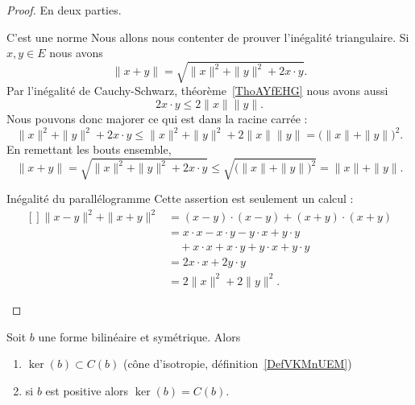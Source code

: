 \begin{proof}
    En deux parties.
    \begin{subproof}
        \item[C'est une norme]
            Nous allons nous contenter de prouver l'inégalité triangulaire. Si \( x,y\in E\) nous avons
            \begin{equation}
                \| x+y \|=\sqrt{\| x \|^2+\| y \|^2+2x\cdot y}.
            \end{equation}
            Par l'inégalité de Cauchy-Schwarz, théorème~\ref{ThoAYfEHG} nous avons aussi
            \begin{equation}
                2x\cdot y\leq 2\| x \|\| y \|.
            \end{equation}
            Nous pouvons donc majorer ce qui est dans la racine carrée :
            \begin{equation}
                \| x \|^2+\| y \|^2+2x\cdot y\leq \| x \|^2+\| y \|^2+2\| x \|\| y \|=\big( \| x \|+\| y \| \big)^2.
            \end{equation}
            En remettant les bouts ensemble,
            \begin{equation}
                \| x+y \|  =\sqrt{\| x \|^2+\| y \|^2+2x\cdot y}  \leq \sqrt{\big( \| x \|+\| y \| \big)^2}=\| x \|+\| y \|.
            \end{equation}

        \item[Inégalité du parallélogramme]
            Cette assertion est seulement un calcul :
            \begin{equation}
                \begin{aligned}[]
                    \| x-y \|^2+\| x+y \|^2&=(x-y)\cdot (x-y)+(x+y)\cdot(x+y)\\
                    &=x\cdot x-x\cdot y-y\cdot x+y\cdot y\\
                    &\quad +x\cdot x+x\cdot y+y\cdot x+y\cdot y\\
                    &=2x\cdot x+2y\cdot y\\
                    &=2\| x \|^2+2\| y \|^2.
                \end{aligned}
            \end{equation}
    \end{subproof}
\end{proof}

\begin{proposition}     \label{PropHIWjdMX}
    Soit \( b\) une forme bilinéaire et symétrique. Alors
    \begin{enumerate}
        \item
            \( \ker(b)\subset C(b)\) (cône d'isotropie, définition~\ref{DefVKMnUEM})
        \item
            si \( b\) est positive alors \( \ker(b)=C(b)\).
    \end{enumerate}
\end{proposition}

